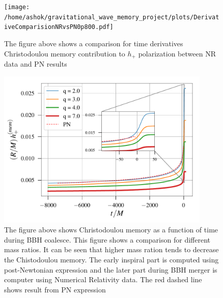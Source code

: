 \documentclass[prd,preprintnumbers,twocolumn,eqsecnum,floatfix,letter]{revtex4}
\begin{document}
\begin{figure}
	\texttt{[image: /home/ashok/gravitational\_wave\_memory\_project/plots/DerivativeComparisionNRvsPN0p800.pdf]}
	\caption{The figure above shows a comparison for time derivatives Christodoulou memory contribution to $h_+$ polarization between NR data and PN results }
	\label{fig:derivative}
\end{figure}
\begin{figure}
 	\includegraphics[width=4.0in]{../plots/MemoryPlot_nonSpining/q7.pdf}
 	\caption{The figure above shows Christodoulou memory as a function of time during BBH coalesce. This figure shows a comparison for different mass ratios. It can be seen that higher mass ration tends to decrease the Chistodoulou memory. The early inspiral part is computed using post-Newtonian expression and the later part during BBH merger is computer using Numerical Relativity data. The red dashed line shows result from PN expression}
 	\label{fig:differentmassratio}
\end{figure}
\end{document}
